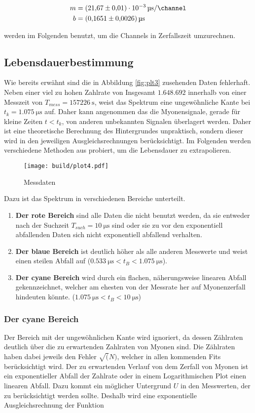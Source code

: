 \begin{align*}
	m&=\qty{21,67(0,01)e-3}{\us\per\channel}\\
	b&=\qty{0,1651(0,0026)}{\us}
\end{align*}

werden im Folgenden benutzt, um die Channels in Zerfallszeit umzurechnen. 

\subsection{Lebensdauerbestimmung}
Wie bereits erwähnt sind die in Abbildung \eqref{fig:plt3} zusehenden Daten fehlerhaft. 
Neben einer viel zu hohen Zahlrate von Insgesamt $1.648.692$ innerhalb von einer Messzeit von $T_{mess}=\qty{157226}{\s}$,
weist das Spektrum eine ungewöhnliche Kante bei $t_k=\qty{1.075}{\us}$ auf.
Daher kann angenommen das die Myonensignale, gerade für kleine Zeiten $t<t_k$, von anderen unbekannten Signalen überlagert werden. 
Daher ist eine theoretische Berechnung des Hintergrundes unpraktisch, sondern dieser wird in den jeweiligen Ausgleichsrechnungen berücksichtigt. 
Im Folgenden werden verschiedene Methoden aus probiert, um die Lebensdauer zu extrapolieren. 
 
\begin{figure}[H]
	\centering
	\texttt{[image: build/plot4.pdf]}
	\caption{Messdaten}\label{fig:plt4}
\end{figure}

Dazu ist das Spektrum in verschiedenen Bereiche unterteilt. 

\begin{enumerate}
	\item \textbf{Der rote Bereich} sind alle Daten die nicht benutzt werden, da sie entweder nach der Suchzeit $T_{such}=\qty{10}{\us}$ sind 
	oder sie zu vor den exponentiell abfallenden Daten sich nicht exponentiell abfallend verhalten. 
	\item \textbf{Der blaue Bereich} ist deutlich höher als alle anderen Messwerte und weist einen steilen Abfall auf ($\qty{0.533}{\us}<t_B<\qty{1.075}{\us}$).
	\item \textbf{Der cyane Bereich} wird durch ein flachen, näherungsweise linearen Abfall gekennzeichnet, 
	welcher am ehesten von der Messrate her auf Myonenzerfall hindeuten könnte. ($\qty{1.075}{\us}<t_B<\qty{10}{\us}$)
\end{enumerate}

\subsubsection{Der cyane Bereich}
Der Bereich mit der ungewöhnlichen Kante wird ignoriert, da dessen Zählraten deutlich über die zu erwartenden Zahlraten von Myonen sind. 
Die Zählraten haben dabei jeweils den Fehler $\sqrt(N) $, welcher in allen kommenden Fits berücksichtigt wird. 
Der zu erwartenden Verlauf von dem Zerfall von Myonen ist ein exponentieller Abfall der Zahlrate oder in einem Logarithmischen Plot einen linearen Abfall. 
Dazu kommt ein möglicher Untergrund $U$ in den Messwerten, der zu berücksichtigt werden sollte. 
Deshalb wird eine exponentielle Ausgleichsrechnung der Funktion

